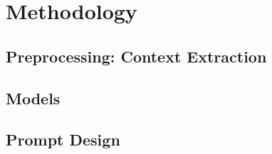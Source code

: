 
\chapter{Methodology}
\label{ch:methodology}


\section{Preprocessing: Context Extraction}
\label{sec:preprocessing}


\section{Models}
\label{sec:models}


\section{Prompt Design}
\label{sec:prompt_design}


